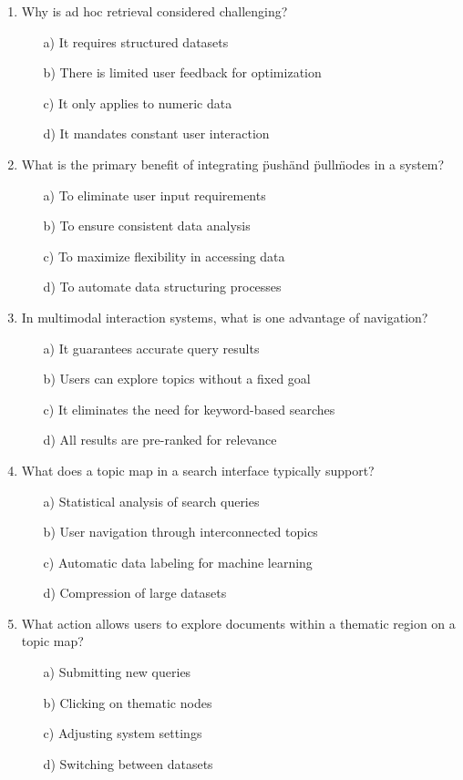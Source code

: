 \documentclass[8pt]{extarticle}
\begin{document}
\begin{multicols}{2}
\begin{enumerate}
\item Why is ad hoc retrieval considered challenging?
\begin{itemize}
    \item[a)] It requires structured datasets
    \item[b)] There is limited user feedback for optimization
    \item[c)] It only applies to numeric data
    \item[d)] It mandates constant user interaction
\end{itemize}

\item What is the primary benefit of integrating \"push\" and \"pull\" modes in a system?
\begin{itemize}
    \item[a)] To eliminate user input requirements
    \item[b)] To ensure consistent data analysis
    \item[c)] To maximize flexibility in accessing data
    \item[d)] To automate data structuring processes
\end{itemize}

\item In multimodal interaction systems, what is one advantage of navigation?
\begin{itemize}
    \item[a)] It guarantees accurate query results
    \item[b)] Users can explore topics without a fixed goal
    \item[c)] It eliminates the need for keyword-based searches
    \item[d)] All results are pre-ranked for relevance
\end{itemize}

\item What does a topic map in a search interface typically support?
\begin{itemize}
    \item[a)] Statistical analysis of search queries
    \item[b)] User navigation through interconnected topics
    \item[c)] Automatic data labeling for machine learning
    \item[d)] Compression of large datasets
\end{itemize}

\item What action allows users to explore documents within a thematic region on a topic map?
\begin{itemize}
    \item[a)] Submitting new queries
    \item[b)] Clicking on thematic nodes
    \item[c)] Adjusting system settings
    \item[d)] Switching between datasets
\end{itemize}


\end{enumerate}
\end{multicols}
\end{document}
